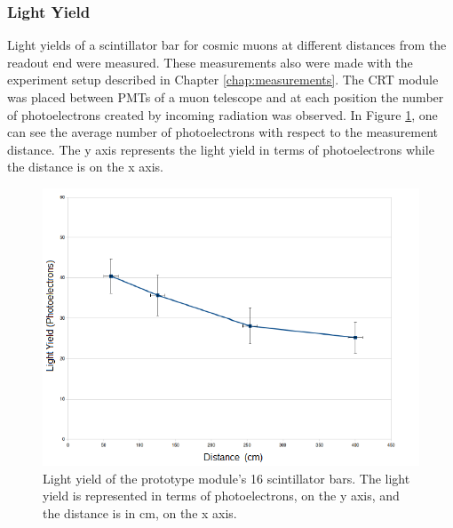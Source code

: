 \documentclass[a4paper]{article}\linespread{1.4}
\begin{document}
\subsubsection{Light Yield}
Light yields of a scintillator bar for cosmic muons at different distances from the readout end were measured. These measurements also were made with the experiment setup described in Chapter \ref{chap:measurements}. 
The CRT module was placed between PMTs of a muon telescope and at each position the number of photoelectrons created by incoming radiation was observed. In Figure \ref{lyo}, one can see the average number of photoelectrons with respect to the measurement distance. The y axis represents the light yield in terms of photoelectrons while the distance is on the x axis. 
\begin{figure}[h!] \centering \includegraphics[width=135mm,scale=1.0]{figures/lyo.png} \caption{Light yield of the prototype module's 16 scintillator bars. The light yield is represented in terms of photoelectrons, on the y axis, and the distance is in cm, on the x axis. \cite{E}}  \label{lyo} \end{figure}
\end{document}
